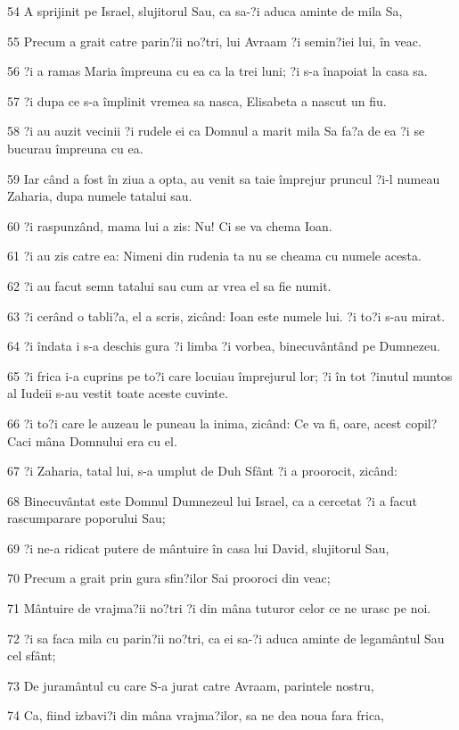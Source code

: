 \par 54 A sprijinit pe Israel, slujitorul Sau, ca sa-?i aduca aminte de mila Sa,
\par 55 Precum a grait catre parin?ii no?tri, lui Avraam ?i semin?iei lui, în veac.
\par 56 ?i a ramas Maria împreuna cu ea ca la trei luni; ?i s-a înapoiat la casa sa.
\par 57 ?i dupa ce s-a împlinit vremea sa nasca, Elisabeta a nascut un fiu.
\par 58 ?i au auzit vecinii ?i rudele ei ca Domnul a marit mila Sa fa?a de ea ?i se bucurau împreuna cu ea.
\par 59 Iar când a fost în ziua a opta, au venit sa taie împrejur pruncul ?i-l numeau Zaharia, dupa numele tatalui sau.
\par 60 ?i raspunzând, mama lui a zis: Nu! Ci se va chema Ioan.
\par 61 ?i au zis catre ea: Nimeni din rudenia ta nu se cheama cu numele acesta.
\par 62 ?i au facut semn tatalui sau cum ar vrea el sa fie numit.
\par 63 ?i cerând o tabli?a, el a scris, zicând: Ioan este numele lui. ?i to?i s-au mirat.
\par 64 ?i îndata i s-a deschis gura ?i limba ?i vorbea, binecuvântând pe Dumnezeu.
\par 65 ?i frica i-a cuprins pe to?i care locuiau împrejurul lor; ?i în tot ?inutul muntos al Iudeii s-au vestit toate aceste cuvinte.
\par 66 ?i to?i care le auzeau le puneau la inima, zicând: Ce va fi, oare, acest copil? Caci mâna Domnului era cu el.
\par 67 ?i Zaharia, tatal lui, s-a umplut de Duh Sfânt ?i a proorocit, zicând:
\par 68 Binecuvântat este Domnul Dumnezeul lui Israel, ca a cercetat ?i a facut rascumparare poporului Sau;
\par 69 ?i ne-a ridicat putere de mântuire în casa lui David, slujitorul Sau,
\par 70 Precum a grait prin gura sfin?ilor Sai prooroci din veac;
\par 71 Mântuire de vrajma?ii no?tri ?i din mâna tuturor celor ce ne urasc pe noi.
\par 72 ?i sa faca mila cu parin?ii no?tri, ca ei sa-?i aduca aminte de legamântul Sau cel sfânt;
\par 73 De juramântul cu care S-a jurat catre Avraam, parintele nostru,
\par 74 Ca, fiind izbavi?i din mâna vrajma?ilor, sa ne dea noua fara frica,
